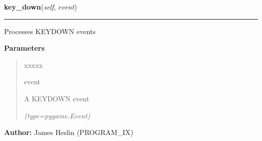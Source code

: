 \hspace{.8\funcindent}\begin{boxedminipage}{\funcwidth}

    \raggedright \textbf{key\_down}(\textit{self}, \textit{event})

    \vspace{-1.5ex}

    \rule{\textwidth}{0.5\fboxrule}
\setlength{\parskip}{2ex}
    Processes KEYDOWN events

\setlength{\parskip}{1ex}
      \textbf{Parameters}
      \vspace{-1ex}

      \begin{quote}
        \begin{Ventry}{xxxxx}

          \item[event]

          A KEYDOWN event

            {\it (type=pygame.Event)}

        \end{Ventry}

      \end{quote}

\textbf{Author:} James Heslin (PROGRAM\_IX)



    \end{boxedminipage}

    \label{pystroke:input_engine:InputEngine:key_up}

    \vspace{0.5ex}

